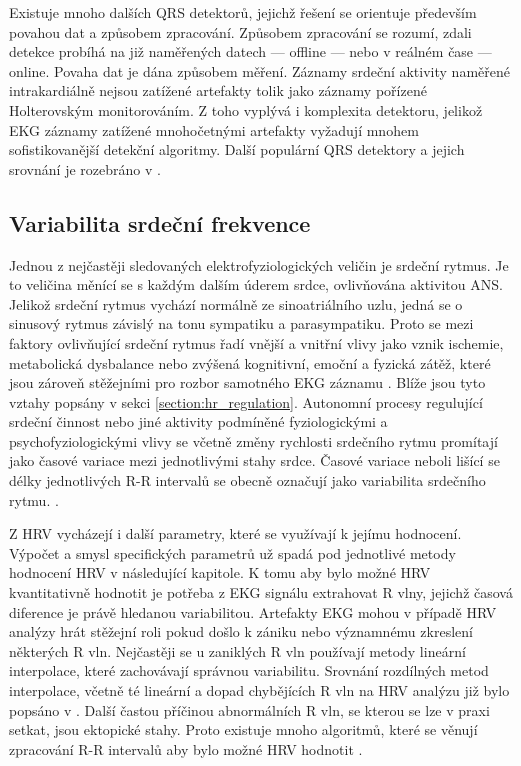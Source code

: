 Existuje mnoho dalších QRS detektorů, jejichž řešení se orientuje především
povahou dat a způsobem zpracování. Způsobem zpracování se rozumí, zdali detekce
probíhá na již naměřených datech --- offline --- nebo v reálném čase --- online.
Povaha dat je dána způsobem měření. Záznamy srdeční aktivity naměřené
intrakardiálně nejsou zatížené artefakty tolik jako záznamy pořízené
Holterovským monitorováním. Z toho vyplývá i komplexita detektoru, jelikož EKG
záznamy zatížené mnohočetnými artefakty vyžadují mnohem sofistikovanější
detekční algoritmy. Další populární QRS detektory a jejich srovnání je rozebráno
v \cite{Kohler2002,Canento2012,Vaneghi2012,Alvarez2013,Karpagachelvi2010}.

\subsection{Variabilita srdeční frekvence}
\label{section:hrv}
Jednou z nejčastěji sledovaných elektrofyziologických veličin je srdeční rytmus.
Je to veličina měnící se s každým dalším úderem srdce, ovlivňována aktivitou
ANS. Jelikož srdeční rytmus vychází normálně ze sinoatriálního uzlu, jedná se o
sinusový rytmus závislý na tonu sympatiku a parasympatiku. Proto se mezi
faktory ovlivňující srdeční rytmus řadí vnější a vnitřní vlivy jako vznik
ischemie, metabolická dysbalance nebo zvýšená kognitivní, emoční a fyzická
zátěž, které jsou zároveň stěžejními pro rozbor samotného EKG záznamu
\cite{Pumprla2014}. Blíže jsou tyto vztahy popsány v sekci
\ref{section:hr_regulation}. Autonomní procesy regulující srdeční činnost nebo
jiné aktivity podmíněné fyziologickými a psychofyziologickými vlivy se včetně
změny rychlosti srdečního rytmu promítají jako časové variace mezi jednotlivými
stahy srdce. Časové variace neboli lišící se délky jednotlivých R-R intervalů se
obecně označují jako variabilita srdečního rytmu.
\cite{Pumprla2014,Rajendra2007}.

Z HRV vycházejí i další parametry, které se využívají k jejímu hodnocení.
Výpočet a smysl specifických parametrů už spadá pod jednotlivé metody hodnocení
HRV v následující kapitole. K tomu aby bylo možné HRV kvantitativně hodnotit je
potřeba z EKG signálu extrahovat R vlny, jejichž časová diference je právě
hledanou variabilitou. Artefakty EKG mohou v případě HRV analýzy hrát stěžejní
roli pokud došlo k zániku nebo významnému zkreslení některých R vln. Nejčastěji
se u zaniklých R vln používají metody lineární interpolace, které zachovávají
správnou variabilitu. Srovnání rozdílných metod interpolace, včetně té lineární
a dopad chybějících R vln na HRV analýzu již bylo popsáno v
\cite{Kim2007,Peltola2012,Morelli2019}. Další častou příčinou abnormálních R
vln, se kterou se lze v praxi setkat, jsou ektopické stahy. Proto existuje mnoho
algoritmů, které se věnují zpracování R-R intervalů aby bylo možné HRV hodnotit
\cite{Lipponen2019}.

